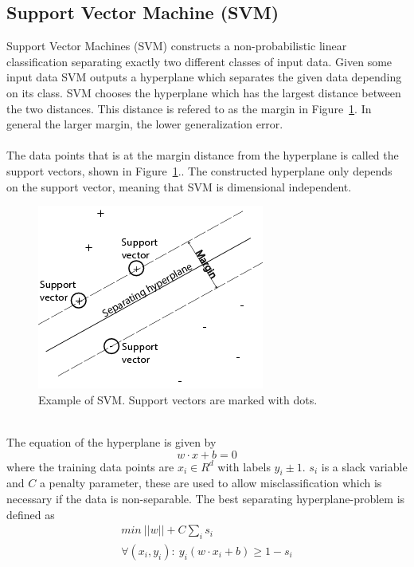 \subsection{Support Vector Machine (SVM)}
Support Vector Machines (SVM) constructs a non-probabilistic linear classification separating exactly two different classes of input data. Given some input data SVM outputs a hyperplane which separates the given data depending on its class. SVM chooses the hyperplane which has the largest distance between the two distances. This distance is refered to as the margin in Figure~\ref{fig:svm}. In general the larger margin, the lower generalization error. \citep{svm_ai} \\\\
The data points that is at the margin distance from the hyperplane is called the support vectors, shown in Figure~\ref{fig:svm}.. The constructed hyperplane only depends on the support vector, meaning that SVM is dimensional independent.
\begin{figure}[h!]
\centering
\includegraphics[scale = 0.7]{fig/svmhyperplane.png}
\caption{Example of SVM. Support vectors are marked with dots. \citep{svm_picture}}
\label{fig:svm}
\end{figure} \\
The equation of the hyperplane is given by
\begin{equation}
w \cdot x + b = 0
\end{equation}
where the training data points are $x_i \in R^d$ with labels $y_i \pm 1$. $s_i$ is a slack variable and $C$ a penalty parameter, these are used to allow misclassification which is necessary if the data is non-separable. The best separating hyperplane-problem is defined as
\begin{equation}
\begin{array}{l}
min \: ||w|| + C \sum_{i} s_i \\
\forall (x_i, y_i) : \: y_i(w \cdot x_i + b) \geq 1 - s_i
\end{array}
\end{equation}
